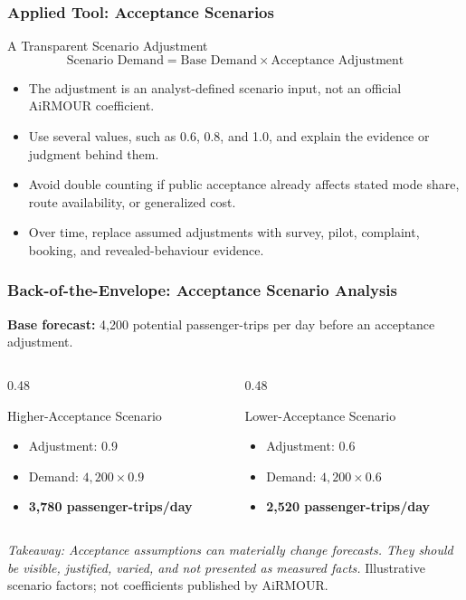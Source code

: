 \documentclass{beamer}
\begin{document}
\begin{frame}[t]
\frametitle{Applied Tool: Acceptance Scenarios}
\begin{block}{A Transparent Scenario Adjustment}
\[
\text{Scenario Demand}=\text{Base Demand}\times\text{Acceptance Adjustment}
\]
\end{block}
\begin{itemize}
\item The adjustment is an analyst-defined scenario input, not an official AiRMOUR coefficient.
\item Use several values, such as 0.6, 0.8, and 1.0, and explain the evidence or judgment behind them.
\item Avoid double counting if public acceptance already affects stated mode share, route availability, or generalized cost.
\item Over time, replace assumed adjustments with survey, pilot, complaint, booking, and revealed-behaviour evidence.
\end{itemize}
\end{frame}

\begin{frame}[t,shrink=10]
\frametitle{Back-of-the-Envelope: Acceptance Scenario Analysis}
\textbf{Base forecast:} 4,200 potential passenger-trips per day before an acceptance adjustment.
\begin{columns}[T]
\begin{column}{0.48\textwidth}\begin{block}{Higher-Acceptance Scenario}
\begin{itemize}
\item Adjustment: 0.9
\item Demand: $4{,}200\times0.9$
\item \textbf{3,780 passenger-trips/day}
\end{itemize}\end{block}\end{column}
\begin{column}{0.48\textwidth}\begin{block}{Lower-Acceptance Scenario}
\begin{itemize}
\item Adjustment: 0.6
\item Demand: $4{,}200\times0.6$
\item \textbf{2,520 passenger-trips/day}
\end{itemize}\end{block}\end{column}
\end{columns}
\textit{Takeaway: Acceptance assumptions can materially change forecasts. They should be visible, justified, varied, and not presented as measured facts.}
\vfill{\tiny Illustrative scenario factors; not coefficients published by AiRMOUR.}
\end{frame}
\end{document}
